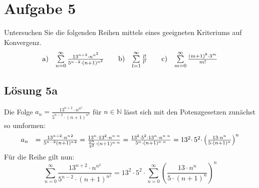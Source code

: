 \section{Aufgabe 5}

Untersuchen Sie die folgenden Reihen mittels eines geeigneten Kriteriums auf Konvergenz.
\begin{align*}
	\begin{array}{ l c }
		\text{a)} & \sum\limits _{n=0}^{\infty }\frac{13^{n+2} \cdotp n^{n^{2}}}{5^{n-2} \cdotp ( n+1)^{n^{2}}}
	\end{array} & & \begin{array}{ l c }
		\text{b)} & \sum\limits _{l=1}^{\infty }\frac{l!}{l^{l}}
	\end{array} & & \begin{array}{ l c }
		\text{c)} & \sum\limits _{m=0}^{\infty }\frac{( m+1)^{8} \cdotp 3^{m}}{m!}
	\end{array}
\end{align*}


\subsection{Lösung 5a}
Die Folge $\displaystyle a_{n} =\frac{13^{n+2} \cdotp n^{n^{2}}}{5^{n-2} \cdotp ( n+1)^{n^{2}}}$ für $\displaystyle n\in \mathbb{N}$ lässt sich mit den Potenzgesetzen zunächst so umformen:
\begin{gather*}
	\begin{array}{ c l }
		a_{n} & =\frac{13^{n+2} \cdotp n{^{n}}^{2}}{5^{n-2}( n+1){^{n}}^{2}} =\frac{13^{n} \cdotp 13^{2} \cdotp n^{n\cdotp n}}{\frac{5^{n}}{5^{2}} \cdotp ( n+1)^{n\cdotp n}} =\frac{13^{2} \cdotp 5^{2} \cdotp 13^{n} \cdotp n^{n\cdotp n}}{5^{n} \cdotp ( n+1)^{n\cdotp n}} =13^{2} \cdotp 5^{2} \cdotp \left(\frac{13 \cdotp n^{n}}{5 \cdotp ( n+1)^{n}}\right)^{n}
	\end{array}\\
\end{gather*}
Für die Reihe gilt nun:
\begin{equation*}
	\sum\limits _{n=0}^{\infty }\frac{13^{n+2} \cdotp n^{n^{2}}}{5^{n-2} \cdotp ( n+1)^{n^{2}}} =13^{2} \cdotp 5^{2} \cdotp \sum\limits _{n=0}^{\infty }\left(\frac{13 \cdotp n^{n}}{5 \cdotp ( n+1)^{n}}\right)^{n}
\end{equation*}


